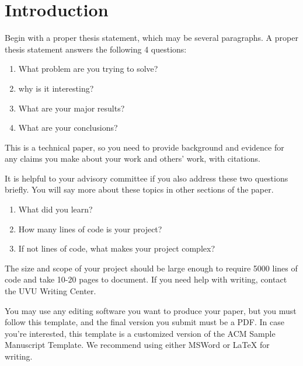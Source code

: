 \documentclass[acmlarge,screen]{acmart}
\begin{document}

\maketitle

\section{Introduction}
Begin with a proper thesis statement, which may be several paragraphs. A proper thesis statement
answers the following 4 questions:
\begin{enumerate}
      \item What problem are you trying to solve?
      \item why is it interesting?
      \item What are your major results?
      \item What are your conclusions?
\end{enumerate}
This is a technical paper, so you need to provide background and evidence for any claims you
make about your work and others' work, with citations.

It is helpful to your advisory committee if you also address these
two questions briefly. You will say more about these topics in other sections of the paper.
\begin{enumerate}
      \item What did you learn?
      \item How many lines of code is your project?
      \item If not lines of code, what makes your project complex?
\end{enumerate}

The size and scope of your project should be large enough to require 
5000 lines of code and take 10-20 pages to document. If you need help with writing, 
contact the UVU Writing Center.

You may use any editing software you want to produce your paper, but you must follow this 
template, and the final version you submit must be a PDF. In case you're interested, this template 
is a customized version of the ACM Sample Manuscript Template. We recommend using either 
MSWord or LaTeX for writing.
\end{document}

